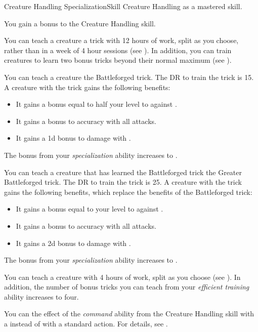     \begin{feat}{Creature Handling Specialization}{Skill}
        \featpre Creature Handling as a mastered skill.

         You gain a  bonus to the Creature Handling skill.

         You can teach a creature a trick with 12 hours of work, split as you choose, rather than in a week of 4 hour sessions (see ).
        In addition, you can train creatures to learn two bonus tricks beyond their normal maximum (see ).

         You can teach a creature the Battleforged trick.
        The DR to train the trick is 15.
        A creature with the trick gains the following benefits:
        \begin{itemize}
            \item It gains a bonus equal to half your level to  against .
            \item It gains a  bonus to accuracy with all attacks.
            \item It gains a \plus1d bonus to damage with .
        \end{itemize}

         The bonus from your \textit{specialization} ability increases to .

         You can teach a creature that has learned the Battleforged trick the Greater Battleforged trick.
        The DR to train the trick is 25.
        A creature with the trick gains the following benefits, which replace the benefits of the Battleforged trick:
        \begin{itemize}
            \item It gains a bonus equal to your level to  against .
            \item It gains a  bonus to accuracy with all attacks.
            \item It gains a \plus2d bonus to damage with .
        \end{itemize}

         The bonus from your \textit{specialization} ability increases to .

         You can teach a creature with 4 hours of work, split as you choose (see ).
        In addition, the number of bonus tricks you can teach from your \textit{efficient training} ability increases to four.

         You can  the effect of the \textit{command} ability from the Creature Handling skill with a  instead of with a standard action.
        For details, see .
    \end{feat}

